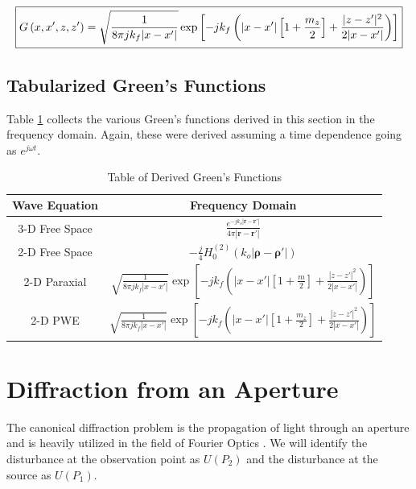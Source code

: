 \begin{equation}
\boxed{G\left(x,x',z,z' \right)= \sqrt{\frac{1}{8\pi jk_f|x-x'|}}\exp\left[-jk_f\left(|x-x'|\left[1+\frac{m_z}{2}\right] + \frac{|z-z'|^2}{2|x-x'|}\right) \right]}\\
\label{gf_eq:202}
\end{equation}
 \renewcommand{\baselinestretch}{2} \small\normalsize

\subsection {Tabularized Green's Functions}
Table \ref{gf_tab:0} collects the various Green's functions derived in this section in the frequency domain. Again, these were derived assuming a time dependence going as $e^{j\omega t}$.
\begin{table}[ht]
  \begin{center}
      \renewcommand{\baselinestretch}{1} \small\normalsize
  \begin{quote}
    \caption[Table of Derived Green's Functions]{Table of Derived Green's Functions\label{gf_tab:0}}
  \end{quote}
  \begin{tabular} {|c | c |}
    \hline
  \bf{Wave Equation} & \bf{Frequency Domain} \\ \hline
  3-D Free Space & $\displaystyle\frac{e^{-jk_o|\mathbf{r} - \mathbf{r}'|}}{4\pi |\mathbf{r} - \mathbf{r}'|}$ \\ \hline
  2-D Free Space & $\displaystyle -\frac{j}{4}H_0^{(2)}\left(k_o|\boldsymbol{\rho} - \boldsymbol{\rho}' | \right)$  \\ \hline
  2-D Paraxial & $\displaystyle\sqrt{\frac{1}{8\pi jk_f|x-x'|}}\exp\left[-jk_f\left(|x-x'|\left[1+\frac{m}{2}\right] + \frac{|z-z'|^2}{2|x-x'|}\right)\right]$\\ \hline
  2-D PWE &$\displaystyle\sqrt{\frac{1}{8\pi jk_f|x-x'|}}\exp\left[-jk_f\left(|x-x'|\left[1+\frac{m_z}{2}\right] + \frac{|z-z'|^2}{2|x-x'|}\right) \right]$ \\ \hline
\end{tabular}
\end{center}
\end{table}
\renewcommand{\baselinestretch}{2} \small\normalsize

\section {Diffraction from an Aperture}
The canonical diffraction problem is the propagation of light through an aperture and is heavily utilized in the field of Fourier Optics \cite{goodman_fourier} \cite{gaskill_fourier}. We will identify the disturbance at the observation point as $U(P_2)$ and the disturbance at the source as $U(P_1)$.

